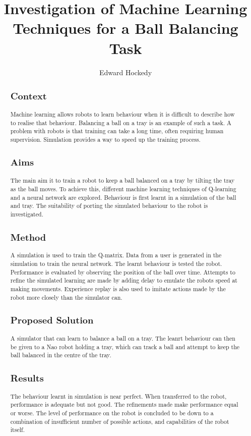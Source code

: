\documentclass[12pt,a4paper]{article}
\title{Investigation of Machine Learning Techniques for a Ball Balancing Task}
\author{Edward Hockedy}
\date{}
\begin{document}
\maketitle

\begin{abstract}
\subsection{Context}
Machine learning allows robots to learn behaviour when it is difficult to describe how to realise that behaviour. Balancing a ball on a tray is an example of such a task. A problem with robots is that training can take a long time, often requiring human supervision. Simulation provides a way to speed up the training process. 

\subsection{Aims}
The main aim it to train a robot to keep a ball balanced on a tray by tilting the tray as the ball moves. To achieve this, different machine learning techniques of Q-learning and a neural network are explored. Behaviour is first learnt in a simulation of the ball and tray. The suitability of porting the simulated behaviour to the robot is investigated.

\subsection{Method}
A simulation is used to train the Q-matrix. Data from a user is generated in the simulation to train the neural network. The learnt behaviour is tested the robot. Performance is evaluated by observing the position of the ball over time. Attempts to refine the simulated learning are made by adding delay to emulate the robots speed at making movements. Experience replay is also used to imitate actions made by the robot more closely than the simulator can.

\subsection{Proposed Solution}
A simulator that can learn to balance a ball on a tray. The leanrt behaviour can then be given to a Nao robot holding a tray, which can track a ball and attempt to keep the ball balanced in the centre of the tray. 

\subsection{Results}
The behaviour learnt in simulation is near perfect. When transferred to the robot, performance is adequate but not good. The refinements made make performance equal or worse. The level of performance on the robot is concluded to be down to a combination of insufficient number of possible actions, and capabilities of the robot itself.

\end{abstract}
\end{document}
